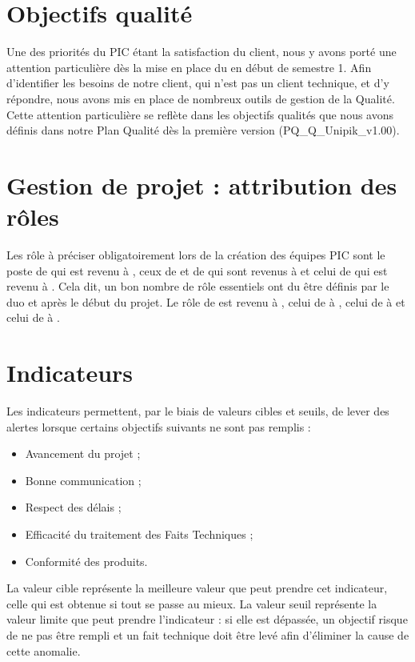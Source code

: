 \documentclass[asi]{picInsa}
\begin{document}
\section{Objectifs qualité}
Une des priorités du PIC étant la satisfaction du client, nous y avons porté une attention particulière dès la mise en place du \SMQ{} en début de semestre 1. Afin d’identifier les besoins de notre client, qui n'est pas un client technique, et d'y répondre, nous avons mis en place de nombreux outils de gestion de la Qualité. Cette attention particulière se reflète dans les objectifs qualités que nous avons définis dans notre Plan Qualité dès la première version (PQ\_Q\_Unipik\_v1.00).


\section{Gestion de projet : attribution des rôles}
Les rôle à préciser obligatoirement lors de la création des équipes PIC sont le poste de \CP{} qui est revenu à \Sergi{}, ceux de \CPA{} et de \RQ{} qui sont revenus à \Pierre{} et celui de \RQA{} qui est revenu à \Kafui{}. Cela dit, un bon nombre de rôle essentiels ont du être définis par le duo \CP{} et \RQ{} après le début du projet. Le rôle de \RGC{} est revenu à \Mathieu{}, celui de \RD{} à \Michel, celui de \RRS{} à \Matthieu{} et celui de \RS{} à \Florian{}.

\section{Indicateurs}
Les indicateurs permettent, par le biais de valeurs cibles et seuils, de lever des alertes lorsque certains objectifs suivants ne sont pas remplis :
\begin{itemize}
\item Avancement du projet ;
\item Bonne communication ;
\item Respect des délais ;
\item Efficacité du traitement des Faits Techniques ;
\item Conformité des produits.
\end{itemize}
La valeur cible représente la meilleure valeur que peut prendre cet indicateur, celle qui est obtenue si tout se passe au mieux. La valeur seuil représente la valeur limite que peut prendre l’indicateur : si elle est dépassée, un objectif risque de ne pas être rempli et un fait technique doit être levé afin d’éliminer la cause de cette anomalie.
\end{document}
